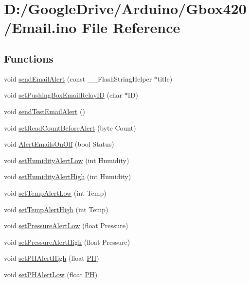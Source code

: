 \hypertarget{_email_8ino}{}\section{D\+:/\+Google\+Drive/\+Arduino/\+Gbox420/\+Email.ino File Reference}
\label{_email_8ino}
\subsection*{Functions}
\begin{DoxyCompactItemize}
\item 
void \mbox{\hyperlink{_email_8ino_a43ec10418608714b8fc70c540802f5bd}{send\+Email\+Alert}} (const \+\_\+\+\_\+\+Flash\+String\+Helper $\ast$title)
\item 
void \mbox{\hyperlink{_email_8ino_a5c41da8d97d4a12c185f295c80b31b45}{set\+Pushing\+Box\+Email\+Relay\+ID}} (char $\ast$ID)
\item 
void \mbox{\hyperlink{_email_8ino_a88a43289031ede97c4f37070c9df991b}{send\+Test\+Email\+Alert}} ()
\item 
void \mbox{\hyperlink{_email_8ino_aaa6f2f12207e4270127859a5a5d32f71}{set\+Read\+Count\+Before\+Alert}} (byte Count)
\item 
void \mbox{\hyperlink{_email_8ino_a693fd3297c0c1cceac3c22fe94fa305b}{Alert\+Emails\+On\+Off}} (bool Status)
\item 
void \mbox{\hyperlink{_email_8ino_a097db98fb141c337a9dec88986cb74a0}{set\+Humidity\+Alert\+Low}} (int Humidity)
\item 
void \mbox{\hyperlink{_email_8ino_a6b5262dce22c63572052abfd6090056f}{set\+Humidity\+Alert\+High}} (int Humidity)
\item 
void \mbox{\hyperlink{_email_8ino_a124dc2ddafba2583d01a77a194ad859f}{set\+Temp\+Alert\+Low}} (int Temp)
\item 
void \mbox{\hyperlink{_email_8ino_a0c7236ef6bd0246425bb4411533f6283}{set\+Temp\+Alert\+High}} (int Temp)
\item 
void \mbox{\hyperlink{_email_8ino_ac1a880d7c1a884a7852d684a8d37b0d4}{set\+Pressure\+Alert\+Low}} (float Pressure)
\item 
void \mbox{\hyperlink{_email_8ino_acdb71d0d46a3d2040c2d4ee6410bce3a}{set\+Pressure\+Alert\+High}} (float Pressure)
\item 
void \mbox{\hyperlink{_email_8ino_a6d2a2a8fa9e9013d89f19c239d048a7a}{set\+P\+H\+Alert\+High}} (float \mbox{\hyperlink{_gbox420_8ino_a24c17fffcda727c63b14ab48a1b63144}{PH}})
\item 
void \mbox{\hyperlink{_email_8ino_a91fa20dc7c663d88fb44cd853fa01ecf}{set\+P\+H\+Alert\+Low}} (float \mbox{\hyperlink{_gbox420_8ino_a24c17fffcda727c63b14ab48a1b63144}{PH}})
\end{DoxyCompactItemize}


